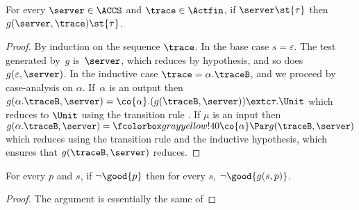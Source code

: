 \begin{lemma}%
  \label{lem:gen-reduces-if}
  \label{lem:gs-reduces}
  For every $\server \in \ACCS$ and $\trace \in \Actfin$, if $\server \st{\tau}$ then $g( \server , \trace ) \st{\tau}$.
\end{lemma}
\begin{proof}
By induction on the sequence $\trace$.
In the base case $s = \varepsilon$. The test generated by~$g$ is~$\server$,
which reduces by hypothesis, and so does $g(\varepsilon,  \server )$.
In the inductive case $\trace = \alpha.\traceB$, and we proceed by case-analysis on $\alpha$.
If~$\alpha$ is an output then $g(\alpha.\traceB,  \server) = \co{\alpha}.(g(\traceB,  \server)) \extc \tau.\Unit$
which reduces to $\Unit$ using the transition rule \extR.
If $\mu$ is an input then $g(\alpha.\traceB,  \server) = \mailbox{ \co{\alpha} } \Par g(\traceB,  \server)$
which reduces using the transition rule
\parR and the inductive hypothesis, which ensures that
$g(\traceB,  \server)$ reduces.
\end{proof}


\begin{lemma}%
  \label{lem:gen-test-unhappy-if}
  For every $p$ and $s$, if $\lnot \good{p}$ then for every $s$,  $\lnot \good{g(s, p)}$.
\end{lemma}
\begin{proof}
The argument is essentially the same of 
\end{proof}






